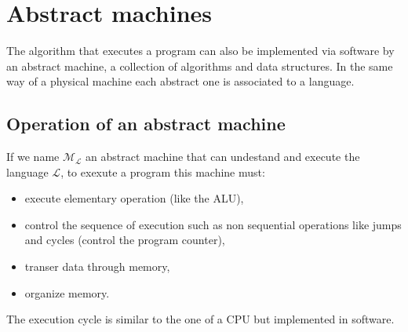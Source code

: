 \section{Abstract machines}
The algorithm that executes a program can also be implemented via software by an abstract machine, a collection of algorithms and data structures. In the same way of a physical machine each abstract one is associated to a language. 
\subsection{Operation of an abstract machine}
If we name $\mathcal{M_L}$ an abstract machine that can undestand and execute the language $\mathcal{L}$, to exexute a program this machine must:
\begin{itemize}
\item execute elementary operation (like the ALU),
\item control the sequence of execution such as non sequential operations like jumps and cycles (control the program counter),
\item transer data through memory,
\item organize memory.
\end{itemize}
The execution cycle is similar to the one of a CPU but implemented in software.